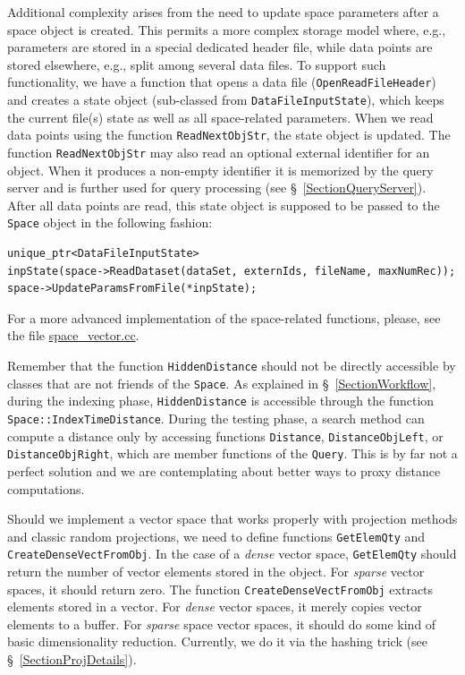 \documentclass[runningheads,a4paper]{llncs}
\newcommand{\replocfile}{https://github.com/searchivarius/nmslib/blob/v1.5/}
\newcommand{\ttt}[1]{\texttt{#1}}
\begin{document}
Additional complexity arises from the need to update space parameters after a space object is created.  
This permits a more complex storage model where, e.g., parameters are stored
in a special dedicated header file, while data points are stored elsewhere,
e.g., split among several data files. 
To support such functionality, we have a function that opens a data file (\ttt{OpenReadFileHeader})
and creates a state object (sub-classed from \ttt{DataFileInputState}),
which keeps the current file(s) state as well as all space-related parameters. 
When we read data points using the function \ttt{ReadNextObjStr}, 
the state object is updated.
The function \ttt{ReadNextObjStr} may also read an optional external identifier for an object.
When it produces a non-empty identifier it is memorized by the query server and is further
used for query processing (see \S~\ref{SectionQueryServer}).
After all data points are read, this state object is supposed to be passed to the \ttt{Space} object
in the following fashion:
\begin{verbatim}
unique_ptr<DataFileInputState> 
inpState(space->ReadDataset(dataSet, externIds, fileName, maxNumRec));
space->UpdateParamsFromFile(*inpState);
\end{verbatim}
For a more advanced implementation of the space-related functions,
please, see the file
\href{\replocfile similarity_search/src/space/space_vector.cc}{space\_vector.cc}.

Remember that the function \ttt{HiddenDistance} should not be directly accessible 
by classes that are not friends of the \ttt{Space}.
As explained in \S~\ref{SectionWorkflow},
during the indexing phase, 
\ttt{HiddenDistance} is accessible through the function
\ttt{Space::IndexTimeDistance}.
During the testing phase, a search method can compute a distance
only by accessing functions \ttt{Distance}, \ttt{DistanceObjLeft}, or
\ttt{DistanceObjRight}, which are member functions of the \ttt{Query}.
This is by far not a perfect solution and we are contemplating about better ways to proxy distance computations. 

Should we implement a vector space that works properly with projection methods
and classic random projections, we need to define functions \ttt{GetElemQty} and \ttt{CreateDenseVectFromObj}. 
In the case of a \emph{dense} vector space, \ttt{GetElemQty}
should return the number of vector elements stored in the object.
For \emph{sparse} vector spaces, it should return zero. The function \ttt{CreateDenseVectFromObj}
extracts elements stored in a vector. For \emph{dense} vector spaces,
it merely copies vector elements to a buffer. 
For \emph{sparse} space vector spaces,
it should do some kind of basic dimensionality reduction. 
Currently, we do it via the hashing trick (see \S~\ref{SectionProjDetails}).
\end{document}
